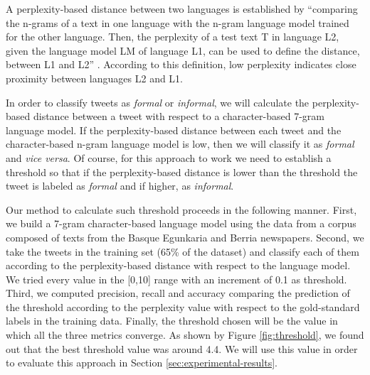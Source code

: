 \documentclass[information,article,submit,moreauthors,pdftex,10pt,a4paper]{Definitions/mdpi}
\begin{document}
A perplexity-based distance between two languages is established by ``comparing the n-grams of a text in one language with the n-gram language model trained for the other language. Then, the perplexity of a test text T in language L2, given the language model LM of language L1, can be used to define the distance, between L1 and L2'' \cite{gamallo2017language}. According to this definition, low perplexity indicates close proximity between languages L2 and L1.

In order to classify tweets as \emph{formal} or \emph{informal}, we will calculate the perplexity-based distance between a tweet with respect to a character-based 7-gram language model. If the perplexity-based distance between each tweet and the character-based n-gram language model is low, then we will classify it as \emph{formal} and \emph{vice versa}. Of course, for this approach to work we need to establish a threshold so that if the perplexity-based distance is lower than the threshold the tweet is labeled as \emph{formal} and if higher, as \emph{informal}.

Our method to calculate such threshold proceeds in the following manner. First, we build a 7-gram character-based language model using the data from a corpus composed of texts from the Basque  Egunkaria and Berria newspapers. Second, we take the tweets in the training set (65\% of the dataset) and classify each of them according to the perplexity-based distance with respect to the language model. We tried every value in the [0,10] range
with an increment of 0.1 as threshold. Third, we computed precision, recall and accuracy comparing the prediction of the threshold according to the perplexity value with respect to the gold-standard labels in the training data. Finally, the threshold chosen will be the value in which all the three metrics converge. As shown by Figure \ref{fig:threshold}, we found out that the best threshold value was around 4.4. We will use this value in order to evaluate this approach in Section \ref{sec:experimental-results}.
\end{document}
